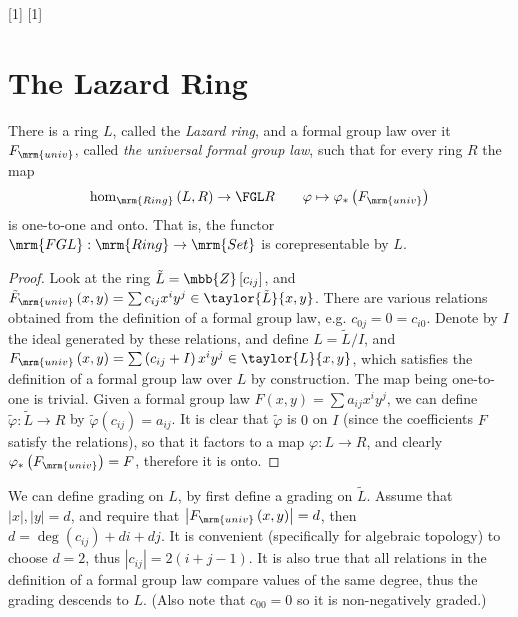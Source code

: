 \ncmd{\LR}[1]{}
\ncmd{\LRQ}[1]{}

\section{The Lazard Ring}

\begin{theorem*}
	There is a ring $L$, called the \emph{Lazard ring}, and a formal group law over it $F_\mrm{univ}$, called \emph{the universal formal group law},
	such that for every ring $R$ the map
	$$
		\hom_\mrm{Ring}\left(L,R\right)
		\to
		\FGL R
		\qquad
		\varphi \mapsto \varphi_*\left(F_\mrm{univ}\right)
	$$
	is one-to-one and onto.
	That is, the functor $\mrm{FGL}: \mrm{Ring} \to \mrm{Set}$ is corepresentable by $L$.
\end{theorem*}

\begin{proof}
	Look at the ring $\tilde{L} = \mbb{Z}\left[c_{ij}\right]$,
	and
	$
		\tilde{F}_\mrm{univ}\left(x,y\right)
		=
		\sum c_{ij} x^i y^j
		\in
		\taylor{\tilde{L}}{x,y}
	$.
	There are various relations obtained from the definition of a formal group law, e.g. $c_{0j} = 0 = c_{i0}$.
	Denote by $I$ the ideal generated by these relations, and define $L=\tilde{L}/I$,
	and
	$
		F_\mrm{univ}\left(x,y\right)
		=
		\sum \left(c_{ij} + I\right) x^i y^j
		\in
		\taylor{L}{x,y}
	$,
	which satisfies the definition of a formal group law over $L$ by construction.
	The map being one-to-one is trivial.
	Given a formal group law $F\left(x,y\right) = \sum a_{ij} x^i y^j$,
	we can define $\tilde{\varphi}: \tilde{L} \to R$ by $\tilde{\varphi}\left(c_{ij}\right) = a_{ij}$.
	It is clear that $\tilde{\varphi}$ is $0$ on $I$ (since the coefficients $F$ satisfy the relations), so that it factors to a map $\varphi: L \to R$, and clearly $\varphi_*\left(F_\mrm{univ}\right) = F$,
	therefore it is onto.
\end{proof}

We can define grading on $L$, by first define a grading on $\tilde{L}$.
Assume that $\left|x\right|,\left|y\right| = d$, and require that $\left|F_\mrm{univ}\left(x,y\right)\right| = d$, then $d = \deg\left(c_{ij}\right) + di +dj$.
It is convenient (specifically for algebraic topology) to choose $d=2$, thus $\left|c_{ij}\right| = 2\left(i+j-1\right)$.
It is also true that all relations in the definition of a formal group law compare values of the same degree, thus the grading descends to $L$.
(Also note that $c_{00}=0$ so it is non-negatively graded.)

